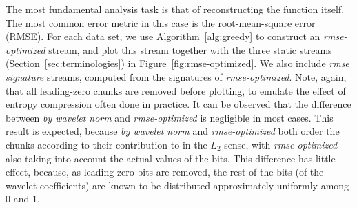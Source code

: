 The most fundamental analysis task is that of reconstructing the function itself. The most common
error metric in this case is the root-mean-square error (RMSE). For each data set, we use
Algorithm~\ref{alg:greedy} to construct an \emph{rmse-optimized} stream, and plot this stream
together with the three static streams (Section~\ref{sec:terminologies}) in
Figure~\ref{fig:rmse-optimized}. We also include \emph{rmse signature} streams, computed from the
signatures of \emph{rmse-optimized}. Note, again, that all leading-zero chunks are removed before
plotting, to emulate the effect of entropy compression often done in practice. It can be observed
that the difference between \emph{by wavelet norm} and \emph{rmse-optimized} is negligible in most
cases. This result is expected, because \emph{by wavelet norm} and \emph{rmse-optimized} both order
the chunks according to their contribution to in the $L_2$ sense, with \emph{rmse-optimized} also
taking into account the actual values of the bits. This difference has little effect, because, as
leading zero bits are removed, the rest of the bits (of the wavelet coefficients) are known to be
distributed approximately uniformly among $0$ and $1$.

